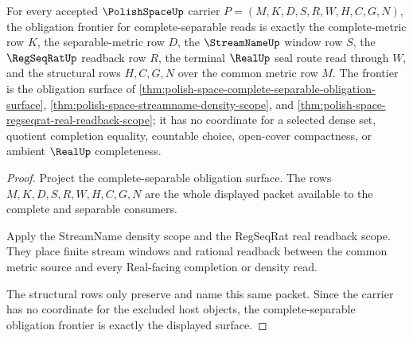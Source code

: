 \begin{theorem}
\label{thm:polishspace-complete-separable-obligation-frontier}
For every accepted $\PolishSpaceUp$ carrier $P=(M,K,D,S,R,W,H,C,G,N)$, the obligation frontier for complete-separable reads is exactly the complete-metric row $K$, the separable-metric row $D$, the $\StreamNameUp$ window row $S$, the $\RegSeqRatUp$ readback row $R$, the terminal $\RealUp$ seal route read through $W$, and the structural rows $H,C,G,N$ over the common metric row $M$. The frontier is the obligation surface of \autoref{thm:polish-space-complete-separable-obligation-surface}, \autoref{thm:polish-space-streamname-density-scope}, and \autoref{thm:polish-space-regseqrat-real-readback-scope}; it has no coordinate for a selected dense set, quotient completion equality, countable choice, open-cover compactness, or ambient $\RealUp$ completeness.
\end{theorem}
\begin{proof}
Project the complete-separable obligation surface. The rows $M,K,D,S,R,W,H,C,G,N$ are the whole displayed packet available to the complete and separable consumers.

Apply the StreamName density scope and the RegSeqRat real readback scope. They place finite stream windows and rational readback between the common metric source and every Real-facing completion or density read.

The structural rows only preserve and name this same packet. Since the carrier has no coordinate for the excluded host objects, the complete-separable obligation frontier is exactly the displayed surface.
\end{proof}

